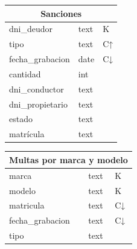 \documentclass[]{article}
\begin{document}
\begin{minipage}{0.45\textwidth}
\begin{table}[H]
    \centering
    \begin{tabular}{lll} 
        \toprule
        \multicolumn{3}{c}{\large\textbf{Sanciones}} \\ 
        \midrule
        dni\_deudor      & text & K \\
        tipo             & text & C↑\\
        fecha\_grabacion & date & C↓\\
        cantidad         & int  &   \\
        dni\_conductor   & text &   \\
        dni\_propietario & text &   \\
        estado           & text &   \\
        matrícula        & text &   \\
        \bottomrule
    \end{tabular}
\end{table}
\end{minipage}
\begin{minipage}{0.45\textwidth}
\begin{table}[H]
    \centering
    \begin{tabular}{lll} 
        \toprule
        \multicolumn{3}{c}{\large\textbf{Multas por marca y modelo}} \\ 
        \midrule
        marca              & text & K\\
        modelo             & text & K\\
        matricula          & text & C↓\\
        fecha\_grabacion   & text & C↓\\
        tipo               & text &  \\
        \bottomrule
    \end{tabular}
\end{table}
\end{minipage}
\end{document}
